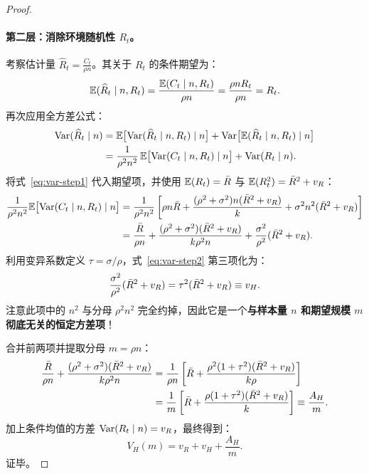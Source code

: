 \begin{proof}
\paragraph{第二层：消除环境随机性 $R_t$。}
考察估计量 $\widehat{R}_t = \frac{C_t}{\rho n}$。其关于 $R_t$ 的条件期望为：
\begin{equation}
  \mathbb{E}(\widehat{R}_t \mid n, R_t) = \frac{\mathbb{E}(C_t \mid n, R_t)}{\rho n} = \frac{\rho n R_t}{\rho n} = R_t.
\end{equation}
再次应用全方差公式：
\begin{align}
  \mathrm{Var}(\widehat{R}_t \mid n) &= \mathbb{E}\big[ \mathrm{Var}(\widehat{R}_t \mid n, R_t) \mid n \big] + \mathrm{Var}\big[ \mathbb{E}(\widehat{R}_t \mid n, R_t) \mid n \big] \nonumber \\
  &= \frac{1}{\rho^2 n^2} \, \mathbb{E}\big[ \mathrm{Var}(C_t \mid n, R_t) \mid n \big] + \mathrm{Var}(R_t \mid n).
\end{align}
将式~\eqref{eq:var-step1} 代入期望项，并使用 $\mathbb{E}(R_t) = \bar{R}$ 与 $\mathbb{E}(R_t^2) = \bar{R}^2 + v_R$：
\begin{align}
  \frac{1}{\rho^2 n^2} \mathbb{E}\big[ \mathrm{Var}(C_t \mid n, R_t) \mid n \big] &= \frac{1}{\rho^2 n^2} \left[ \rho n \bar{R} + \frac{(\rho^2 + \sigma^2) n (\bar{R}^2 + v_R)}{k} + \sigma^2 n^2 (\bar{R}^2 + v_R) \right] \nonumber \\
  &= \frac{\bar{R}}{\rho n} + \frac{(\rho^2 + \sigma^2)(\bar{R}^2 + v_R)}{k \rho^2 n} + \frac{\sigma^2}{\rho^2}(\bar{R}^2 + v_R).
  \label{eq:var-step2}
\end{align}
利用变异系数定义 $\tau = \sigma / \rho$，式~\eqref{eq:var-step2} 第三项化为：
\begin{equation}
  \frac{\sigma^2}{\rho^2}(\bar{R}^2 + v_R) = \tau^2(\bar{R}^2 + v_R) \equiv v_H.
\end{equation}
注意此项中的 $n^2$ 与分母 $\rho^2 n^2$ 完全约掉，因此它是一个\textbf{与样本量 $n$ 和期望规模 $m$ 彻底无关的恒定方差项}！

合并前两项并提取分母 $m = \rho n$：
\begin{align}
  \frac{\bar{R}}{\rho n} + \frac{(\rho^2 + \sigma^2)(\bar{R}^2 + v_R)}{k \rho^2 n} &= \frac{1}{\rho n} \left[ \bar{R} + \frac{\rho^2(1 + \tau^2)(\bar{R}^2 + v_R)}{k \rho} \right] \nonumber \\
  &= \frac{1}{m} \left[ \bar{R} + \frac{\rho(1 + \tau^2)(\bar{R}^2 + v_R)}{k} \right] \equiv \frac{A_H}{m}.
\end{align}
加上条件均值的方差 $\mathrm{Var}(R_t \mid n) = v_R$，最终得到：
\begin{equation}
  V_H(m) = v_R + v_H + \frac{A_H}{m}.
\end{equation}
证毕。
\end{proof}

